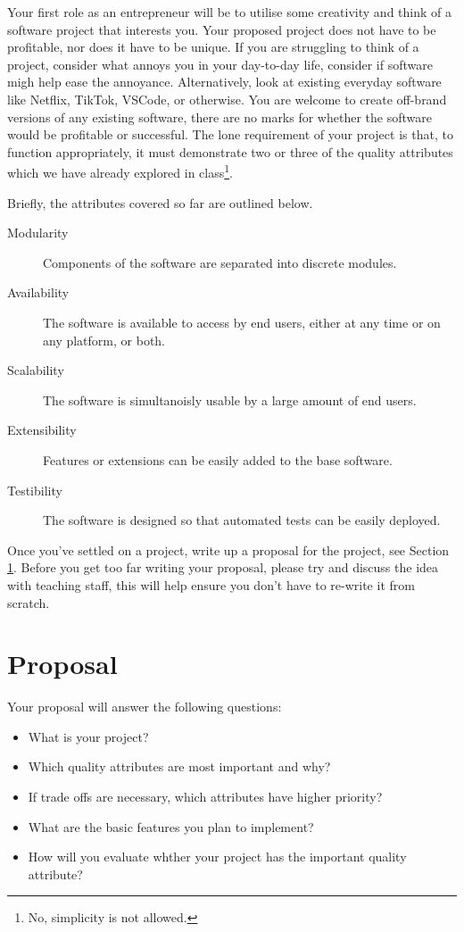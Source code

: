 \documentclass{csse4400}
\begin{document}
Your first role as an entrepreneur will be to utilise some creativity and think of a software project that interests you.
Your proposed project does not have to be profitable, nor does it have to be unique.
If you are struggling to think of a project, consider what annoys you in your day-to-day life, consider if software migh help ease the annoyance.
Alternatively, look at existing everyday software like Netflix, TikTok, VSCode, or otherwise.
You are welcome to create off-brand versions of any existing software,
there are no marks for whether the software would be profitable or successful.
The lone requirement of your project is that, to function appropriately, it must demonstrate two or three of the quality attributes 
which we have already explored in class\footnote{No, simplicity is not allowed.}.

Briefly, the attributes covered so far are outlined below.
\begin{description}
    \item[Modularity] Components of the software are separated into discrete modules.
    \item[Availability] The software is available to access by end users, either at any time or on any platform, or both.
    \item[Scalability] The software is simultanoisly usable by a large amount of end users.
    \item[Extensibility] Features or extensions can be easily added to the base software.
    \item[Testibility] The software is designed so that automated tests can be easily deployed.
\end{description}

\noindent
Once you've settled on a project, write up a proposal for the project, see Section \ref{sect:proposal}.
Before you get too far writing your proposal,
please try and discuss the idea with teaching staff,
this will help ensure you don't have to re-write it from scratch.


\section{Proposal}\label{sect:proposal}
Your proposal will answer the following questions:
\begin{itemize}
    \item What is your project?
    \item Which quality attributes are most important and why?
    \item If trade offs are necessary, which attributes have higher priority?
    \item What are the basic features you plan to implement?
    \item How will you evaluate whther your project has the important quality attribute?
\end{itemize}
\end{document}
